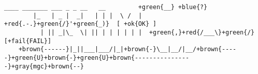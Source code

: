 \documentclass[]{article}
\begin{document}
\begin{Verbatim}[commandchars=+\{\}]
         ____ _______ ___ _ _ __   __         +green{__} +blue{?}
        |_   | _ |  _|   | | |  \ /  |    +red{.-.}+green{/}'+green{_)}  [ +ok{OK} ]
          | || _|\_  \| || | | | | | |  +green{,}+red{/___\}+green{/}    [+fail{FAIL}]
    +brown{------}|_||___|___/|_|+brown{-}\__|__/|__/+brown{-----}+green{U}+brown{-}+green{U}+brown{----------------}+gray{mgc}+brown{--}
\end{Verbatim}
\end{document}
